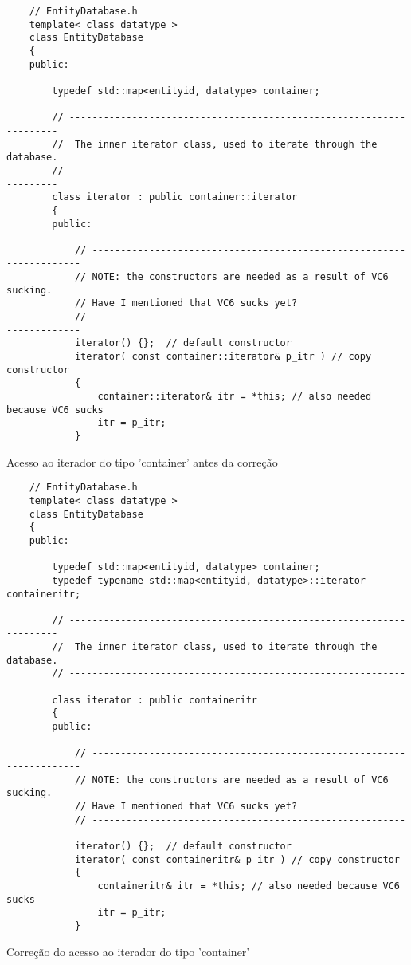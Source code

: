 \begin{listing}[!ht]
    \begin{verbatim}
    // EntityDatabase.h
    template< class datatype >
    class EntityDatabase
    {
    public:

        typedef std::map<entityid, datatype> container;

        // --------------------------------------------------------------------
        //  The inner iterator class, used to iterate through the database.
        // --------------------------------------------------------------------
        class iterator : public container::iterator
        {
        public:

            // --------------------------------------------------------------------
            // NOTE: the constructors are needed as a result of VC6 sucking.
            // Have I mentioned that VC6 sucks yet?
            // --------------------------------------------------------------------
            iterator() {};  // default constructor
            iterator( const container::iterator& p_itr ) // copy constructor
            {
                container::iterator& itr = *this; // also needed because VC6 sucks
                itr = p_itr;
            }
    \end{verbatim}
\caption{Acesso ao iterador do tipo 'container' antes da correção}
\label{lst:containeritrOri}
\end{listing}

\begin{listing}[!ht]
    \begin{verbatim}
    // EntityDatabase.h
    template< class datatype >
    class EntityDatabase
    {
    public:

        typedef std::map<entityid, datatype> container;
        typedef typename std::map<entityid, datatype>::iterator containeritr;

        // --------------------------------------------------------------------
        //  The inner iterator class, used to iterate through the database.
        // --------------------------------------------------------------------
        class iterator : public containeritr
        {
        public:

            // --------------------------------------------------------------------
            // NOTE: the constructors are needed as a result of VC6 sucking.
            // Have I mentioned that VC6 sucks yet?
            // --------------------------------------------------------------------
            iterator() {};  // default constructor
            iterator( const containeritr& p_itr ) // copy constructor
            {
                containeritr& itr = *this; // also needed because VC6 sucks
                itr = p_itr;
            }
    \end{verbatim}
\caption{Correção do acesso ao iterador do tipo 'container'}
\label{lst:containeritrFix}
\end{listing}


